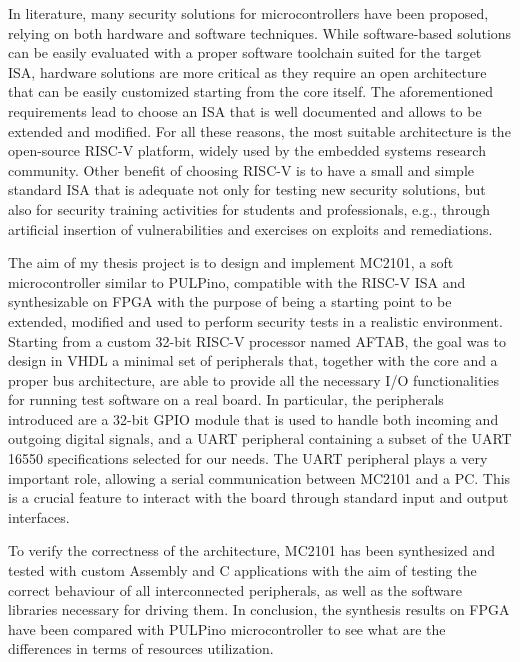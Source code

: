 \documentclass[%
    formato=a4paper,
    corpo=11pt,
    twoside,
    stile=standard,
    tipotesi=magistrale,
    evenboxes,
    english
]{toptesi}
\begin{document}
In literature, many security solutions for microcontrollers have been proposed, relying on both hardware and software techniques.
While software-based solutions can be easily evaluated with a proper software toolchain suited for the target ISA, hardware solutions are more critical as they require an open architecture that can be easily customized starting from the core itself. The aforementioned requirements lead to choose an ISA that is well documented and allows to be extended and modified. For all these reasons, the most suitable architecture is the open-source RISC-V platform, widely used by the embedded systems research community. Other benefit of choosing RISC-V is to have a small and simple standard ISA that is adequate not only for testing new security solutions, but also for security training activities for students and professionals, e.g., through artificial insertion of vulnerabilities and exercises on exploits and remediations. 

The aim of my thesis project is to design and implement MC2101, a soft microcontroller similar to PULPino, compatible with the RISC-V ISA and synthesizable on FPGA with the purpose of being a starting point to be extended, modified and used to perform security tests in a realistic environment. Starting from a custom 32-bit RISC-V processor named AFTAB, the goal was to design in VHDL a minimal set of peripherals that, together with the core and a proper bus architecture, are able to provide all the necessary I/O functionalities for running test software on a real board. In particular, the peripherals introduced are a 32-bit GPIO module that is used to handle both incoming and outgoing digital signals, and a UART peripheral containing a subset of the UART 16550 specifications selected for our needs. The UART peripheral plays a very important role, allowing a serial communication between MC2101 and a PC. This is a crucial feature to interact with the board through standard input and output interfaces.

To verify the correctness of the architecture, MC2101 has been synthesized and tested with custom Assembly and C applications with the aim of testing the correct behaviour of all interconnected peripherals, as well as the software libraries necessary for driving them. In conclusion, the synthesis results on FPGA have been compared with PULPino microcontroller to see what are the differences in terms of resources utilization.


\figurespagetrue
\tablespagetrue
\indici

%    
%


%



%
%    
%
\appendix
%
%

\cleardoublepage
{}
{}
\printbibliography
\end{document}

